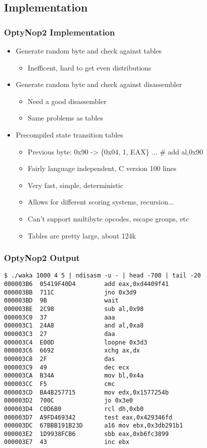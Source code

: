 \documentclass{beamer}
\newenvironment{sitemize}{\vspace{1mm}\begin{itemize}\itemsep 4pt\small}{\end{itemize}}
\begin{document}
\subsection{Implementation}

\begin{frame}
  \frametitle{OptyNop2 Implementation}
  \begin{sitemize}
    \item Generate random byte and check against tables
    \begin{sitemize}
      \item Inefficent, hard to get even distributions
    \end{sitemize}
    \pause

    \item Generate random byte and check against disassembler
    \begin{sitemize}
      \item Need a good disassembler
      \item Same problems as tables
    \end{sitemize}
    \pause

    \item Precompiled state transition tables
    \begin{sitemize}
      \item Previous byte: 0x90 -> \{0x04, 1, EAX\} ... \# add al,0x90
      \pause
      \item Fairly language independent, C version 100 lines
      \item Very fast, simple, deterministic
      \item Allows for different scoring systems, recursion...
      \pause
      \item Can't support multibyte opcodes, escape groups, etc
      \item Tables are pretty large, about 124k
    \end{sitemize}

  \end{sitemize}
\end{frame}

\begin{frame}[fragile]
  \frametitle{OptyNop2 Output}
  {\footnotesize
  \begin{verbatim}
$ ./waka 1000 4 5 | ndisasm -u - | head -700 | tail -20
000003B6  05419F40D4        add eax,0xd4409f41
000003BB  711C              jno 0x3d9
000003BD  9B                wait
000003BE  2C98              sub al,0x98
000003C0  37                aaa
000003C1  24A8              and al,0xa8
000003C3  27                daa
000003C4  E00D              loopne 0x3d3
000003C6  6692              xchg ax,dx
000003C8  2F                das
000003C9  49                dec ecx
000003CA  B34A              mov bl,0x4a
000003CC  F5                cmc
000003CD  BA4B257715        mov edx,0x1577254b
000003D2  700C              jo 0x3e0
000003D4  C0D6B0            rcl dh,0xb0
000003D7  A9FD469342        test eax,0x429346fd
000003DC  67BBB191B23D      a16 mov ebx,0x3db291b1
000003E2  1D9938FCB6        sbb eax,0xb6fc3899
000003E7  43                inc ebx
\end{verbatim}
}

\end{frame}
\end{document}
